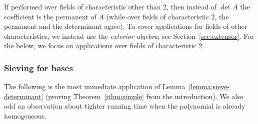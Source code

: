 \documentclass{theoretics}
\begin{document}
If performed over fields of characteristic other than 2, then instead
of $\det A$ the coefficient is the permanent of $A$ (while over fields
of characteristic 2, the permanent and the determinant agree). To
cover applications for fields of other characteristics, we instead use
the \emph{exterior algebra}; see Section~\ref{sec:extensor}. For the
below, we focus on applications over fields of characteristic 2. 

\subsubsection{Sieving for bases} \label{sec:sieve-basis}

The following is the most immediate application of Lemma~\ref{lemma:sieve-determinant}
(proving Theorem~\ref{ithm:simple} from the introduction).
We also add an observation about tighter running time when the
polynomial is already homogeneous. 
\end{document}
